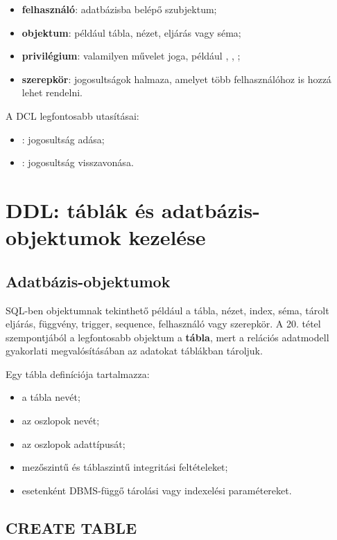 \begin{itemize}
  \item \textbf{felhasználó}: adatbázisba belépő szubjektum;
  \item \textbf{objektum}: például tábla, nézet, eljárás vagy séma;
  \item \textbf{privilégium}: valamilyen művelet joga, például , , ;
  \item \textbf{szerepkör}: jogosultságok halmaza, amelyet több felhasználóhoz is hozzá lehet rendelni.
\end{itemize}

A DCL legfontosabb utasításai:

\begin{itemize}
  \item {}: jogosultság adása;
  \item {}: jogosultság visszavonása.
\end{itemize}

\section{DDL: táblák és adatbázis-objektumok kezelése}

\subsection{Adatbázis-objektumok}

SQL-ben objektumnak tekinthető például a tábla, nézet, index, séma, tárolt eljárás, függvény, trigger, sequence, felhasználó vagy szerepkör. A 20. tétel szempontjából a legfontosabb objektum a \textbf{tábla}, mert a relációs adatmodell gyakorlati megvalósításában az adatokat táblákban tároljuk.

Egy tábla definíciója tartalmazza:

\begin{itemize}
  \item a tábla nevét;
  \item az oszlopok nevét;
  \item az oszlopok adattípusát;
  \item mezőszintű és táblaszintű integritási feltételeket;
  \item esetenként DBMS-függő tárolási vagy indexelési paramétereket.
\end{itemize}

\subsection{CREATE TABLE}

